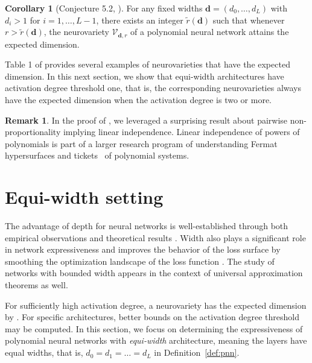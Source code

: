 \documentclass[12pt]{article}
\theoremstyle{definition}
\newtheorem{corollary}[theorem]{Corollary}
\newtheorem{remark}[theorem]{Remark}
\newcommand{\bfd}{\mathbf{d}}
\newcommand{\demph}[1]{\emph{{\color{RoyalBlue}#1}}}
\begin{document}
\begin{corollary}[Conjecture 5.2, \cite{KLW2024}]
    For any fixed widths $\bfd = (d_0, \dots , d_L)$ 
    with $d_i > 1$ for $i = 1,\dots,L-1$, there exists an integer $\tilde r(\bfd)$ such that whenever $r > \tilde r(\bfd)$,  the neurovariety $\mathcal{V}_{\bfd,r}$ of a polynomial neural network attains the expected dimension.
\end{corollary}

Table 1 of \cite{KLW2024} provides several examples of neurovarieties that have the expected dimension. In this next section, we show that equi-width architectures have activation degree threshold one, that is, the corresponding neurovarieties always have the expected dimension when the activation degree is two or more. 

\begin{remark}
{In the proof of , we leveraged a surprising result about pairwise non-proportionality implying linear independence. 
Linear independence of powers of polynomials is part of a larger research program of understanding Fermat hypersurfaces and tickets~\cite{Reznick2001} of polynomial systems.}
\end{remark}

\section{Equi-width setting}\label{s:equi-width-setting}
The advantage of depth for neural networks is well-established through both empirical observations and theoretical results \cite{Montufar2014, Telgarsky2016, Mhaskar2016, Raghu2017}. Width also plays a significant role in network expressiveness and improves the behavior of the loss surface by smoothing the optimization landscape of the loss function \cite{Hertrich2023,Nguyen2018, Nguyen2018b}. The study of networks with bounded width appears in the context of universal approximation theorems \cite{Hanin2018,KidgerLyons2020,Lu2017} as well. 



For sufficiently high activation degree, a neurovariety has the expected dimension by . For specific architectures, better bounds on the activation degree threshold may be computed.
In this section, we focus on determining the expressiveness of polynomial neural networks with \demph{equi-width} architecture, meaning the layers have equal 
widths, that is, 
$d_0=d_1=\dots=d_L$
in Definition~\ref{def:pnn}.
\end{document}
